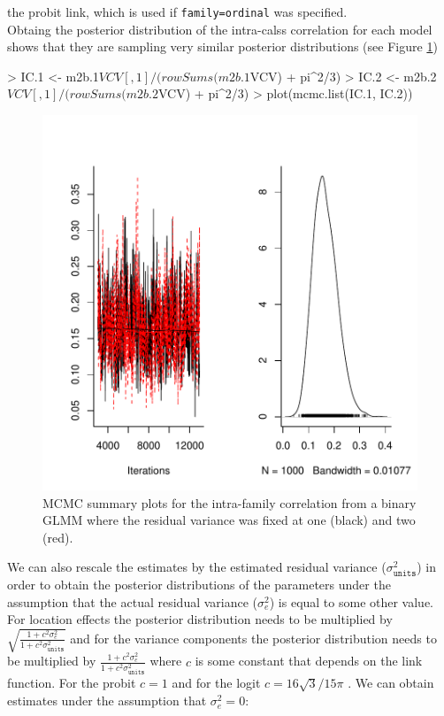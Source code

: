 \documentclass{article}
\begin{document}
the probit link, which is used if \texttt{family=ordinal} was specified.\\

Obtaing the posterior distribution of the intra-calss correlation for each model shows that they are sampling very similar posterior distributions (see Figure \ref{IC-fig}) 

\begin{Schunk}
\begin{Sinput}
> IC.1 <- m2b.1$VCV[, 1]/(rowSums(m2b.1$VCV) + pi^2/3)
> IC.2 <- m2b.2$VCV[, 1]/(rowSums(m2b.2$VCV) + pi^2/3)
> plot(mcmc.list(IC.1, IC.2))
\end{Sinput}
\end{Schunk}

\begin{figure}[!h]
\begin{center}
\includegraphics{Lecture2-067}
\end{center}
\caption{MCMC summary plots for the intra-family correlation from  a binary GLMM where the residual variance was fixed at one (black) and two (red).}
\label{IC-fig}
\end{figure}

We can also rescale the estimates by the estimated residual variance ($\sigma^{2}_{\texttt{units}}$) in order to obtain the posterior distributions of the parameters under the assumption that the actual residual variance ($\sigma^{2}_{e}$) is equal to some other value.  For location effects the posterior distribution needs to be multiplied by $\sqrt{\frac{1+c^{2}\sigma^{2}_{e}}{1+c^{2}\sigma^{2}_{\texttt{units}}}}$ and for the variance components the posterior distribution needs to be multiplied by $\frac{1+c^{2}\sigma^{2}_{e}}{1+c^{2}\sigma^{2}_{\texttt{units}}}$ where $c$ is some constant that depends on the link function. For the probit $c=1$ and for the logit $c=16\sqrt{3}/15\pi$ \citep{Zeger.1988}. We can obtain estimates under the assumption that $\sigma^{2}_{e}=0$: 
\end{document}
